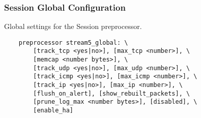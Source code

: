 \documentclass[english]{report}
\begin{document}
\subsubsection{Session Global Configuration}

Global settings for the Session preprocessor.

\begin{verbatim}
    preprocessor stream5_global: \
        [track_tcp <yes|no>], [max_tcp <number>], \
        [memcap <number bytes>], \
        [track_udp <yes|no>], [max_udp <number>], \
        [track_icmp <yes|no>], [max_icmp <number>], \
        [track_ip <yes|no>], [max_ip <number>], \
        [flush_on_alert], [show_rebuilt_packets], \
        [prune_log_max <number bytes>], [disabled], \
        [enable_ha]
\end{verbatim}
\end{document}

